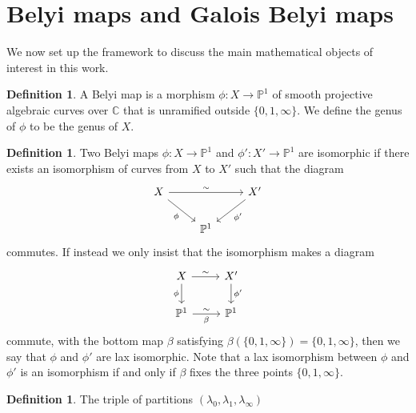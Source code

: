 \documentclass{dcthesis}
\newcommand{\PP}{\mathbb P}
\newcommand{\CC}{\mathbb C}
\newcommand{\defi}[1]{\textsf{#1}}
\numberwithin{equation}{section}
\theoremstyle{definition}
\newtheorem{definition}[equation]{Definition}
\theoremstyle{remark}
\begin{document}
{{  \section{Belyi maps and Galois Belyi maps}{\label{sec:belyimaps}
    We now set up the framework to discuss
    the main mathematical objects of interest in this work.
    \begin{definition}\label{def:belyimap}
      A
      \defi{Belyi map}
      is a morphism
      $\phi\colon X \to \PP^1$
      of
      smooth projective
      algebraic curves over $\CC$
      that is
      unramified outside
      $\{0,1,\infty\}$.
      We define the \defi{genus} of $\phi$
      to be the genus of $X$.
    \end{definition}
    \begin{definition}\label{def:belyiiso}
      Two Belyi maps
      $\phi\colon X\to\PP^1$ and
      $\phi'\colon X'\to\PP^1$
      are \defi{isomorphic}
      if there exists an isomorphism
      of curves from
      $X$ to $X'$
      such that the diagram
      \begin{equation}
        \label{eqn:belyiiso}
        \begin{tikzcd}
          X\arrow{rr}{\sim}\arrow{dr}[swap]{\phi}
          &
          &X'\arrow{dl}{\phi'}\\
          &\PP^1
        \end{tikzcd}
      \end{equation}
      commutes.
      If instead we only insist that
      the isomorphism
      makes a diagram
      \begin{equation}
        \label{eqn:}
        \begin{tikzcd}
          X\arrow{r}{\sim}\arrow{d}[swap]{\phi}&X'\arrow{d}{\phi'}\\
          \PP^1\arrow{r}{\sim}[swap]{\beta}&\PP^1
        \end{tikzcd}
      \end{equation}
      commute,
      with the bottom map
      $\beta$ satisfying
      $\beta(\{0,1,\infty\}) =
      \{0,1,\infty\}$,
      then we say that $\phi$ and $\phi'$
      are \defi{lax isomorphic}.
      Note that a lax isomorphism
      between $\phi$ and $\phi'$ is an
      isomorphism if and only if
      $\beta$ fixes the three points
      $\{0,1,\infty\}$.
    \end{definition}
    \begin{definition}\label{def:ramificationtype}
      The triple of partitions
      $(\lambda_0,\lambda_1,\lambda_\infty)$

\end{definition}}}}
\end{document}
